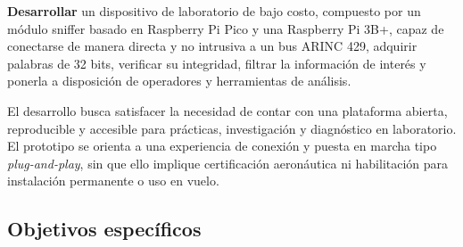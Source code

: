 \documentclass[12pt,a4paper,oneside]{article}
\begin{document}
\textbf{Desarrollar} un dispositivo de laboratorio de bajo costo, compuesto por un módulo sniffer basado en Raspberry Pi Pico y una Raspberry Pi 3B+, capaz de conectarse de manera directa y no intrusiva a un bus ARINC 429, adquirir palabras de 32 bits, verificar su integridad, filtrar la información de interés y ponerla a disposición de operadores y herramientas de análisis.

El desarrollo busca satisfacer la necesidad de contar con una plataforma abierta, reproducible y accesible para prácticas, investigación y diagnóstico en laboratorio. El prototipo se orienta a una experiencia de conexión y puesta en marcha tipo \textit{plug-and-play}, sin que ello implique certificación aeronáutica ni habilitación para instalación permanente o uso en vuelo.

\subsection{Objetivos específicos}
\end{document}
